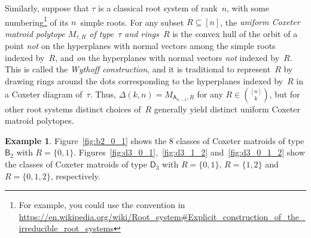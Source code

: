 \documentclass[11pt]{amsart}
\newcommand\BB{{\mathsf B}}
\newcommand\DD{{\mathsf D}}
\theoremstyle{definition}
\newtheorem{example}[theorem]{Example}
\begin{document}
Similarly, suppose that $\tau$ is a classical root system of rank~$n$, with some numbering\footnote{For example, you could use the convention in \url{https://en.wikipedia.org/wiki/Root\_system\#Explicit\_construction\_of\_the\_irreducible\_root\_systems}} of its $n$~simple roots.
For any subset $R\subseteq[n]$, the \emph{uniform Coxeter matroid polytope $M_{\tau,R}$ of type~$\tau$ and rings~$R$} is the convex hull of the orbit of a point \emph{not} on the hyperplanes with normal vectors among the simple roots indexed by~$R$, and \emph{on} the hyperplanes with normal vectors \emph{not} indexed by~$R$.
This is called the \emph{Wythoff construction}, and it is traditional to represent~$R$ by drawing rings around the dots corresponding to the hyperplanes indexed by~$R$ in a Coxeter diagram of~$\tau$.
Thus, $\Delta(k,n) = M_{\mathsf{A}_{n-1}, R}$ for any $R\in\binom{[n]}{k}$, but for other root systems distinct choices of~$R$ generally yield distinct uniform Coxeter matroid polytopes.

\begin{example}
  Figure~\ref{fig:b2_0_1} shows the $8$ classes of Coxeter matroids of type $\BB_2$ with $R=\{0,1\}$.
  Figures~\ref{fig:d3_0_1},~\ref{fig:d3_1_2} and~\ref{fig:d3_0_1_2} show the classes of Coxeter matroids of type $\DD_3$ with $R=\{0,1\}$, $R=\{1,2\}$ and $R=\{0,1,2\}$, respectively.
\end{example}
\end{document}
